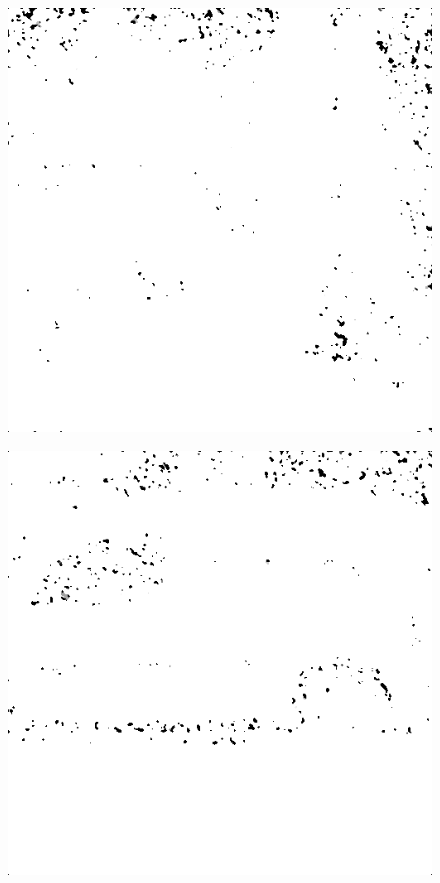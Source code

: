 \begin{figure}[H]
\begin{minipage}[t]{0.3\linewidth}
	\label{fig:hus_m20}
\end{minipage}
\begin{minipage}[t]{0.3\linewidth} %
	\includegraphics[width = 1\linewidth]{gfx/sit/sit_m20.png}
	\label{fig:sit_m20}
\end{minipage}
\begin{minipage}[t]{0.3\linewidth} %
	\includegraphics[width = 1\linewidth]{gfx/car/car_m25.png}

\end{minipage}
\end{figure}
